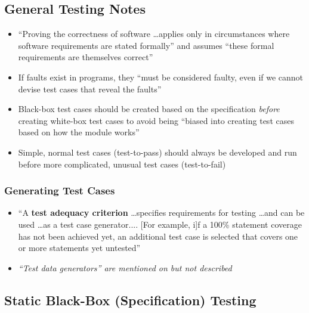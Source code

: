 \subsection{General Testing Notes}

\begin{itemize}
      \item ``Proving the correctness of software \dots applies only in
            circumstances where software requirements are stated formally'' and
            assumes ``these formal requirements are themselves correct''
            \cite[p.~398]{van_vliet_software_2000}
      \item If faults exist in programs, they ``must be considered faulty, even
            if we cannot devise test cases that reveal the faults''
            \cite[p.~401]{van_vliet_software_2000}
      \item Black-box test cases should be created based on the specification
            \emph{before} creating white-box test cases to avoid being ``biased
            into creating test cases based on how the module works''
            \cite[p.~113]{patton_software_2006}
      \item Simple, normal test cases (test-to-pass) should always be developed
            and run before more complicated, unusual test cases (test-to-fail)
            \cite[p.~66]{patton_software_2006}
\end{itemize}

\subsubsection{Generating Test Cases}

\begin{itemize}
      \item ``A \textbf{test adequacy criterion} \dots specifies requirements
            for testing \dots and can be used \dots as a test case generator....
                  [For example, i]f a 100\% statement coverage has not been achieved
            yet, an additional test case is selected that covers one or more
            statements yet untested'' \cite[p.~402]{van_vliet_software_2000}
      \item \emph{``Test data generators'' are mentioned on
                  \cite[p.~410]{van_vliet_software_2000} but not described}
\end{itemize}

\subsection{Static Black-Box (Specification) Testing
      \cite[p.~56-62]{patton_software_2006}}

